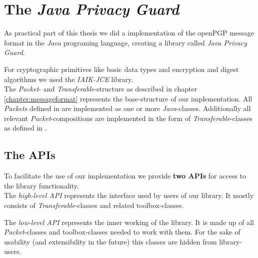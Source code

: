 \chapter{The \textit{Java Privacy Guard}} \label{chapter:jpg}


As practical part of this thesis we did a implementation of the openPGP message format \citep{RFC4880} in the \textit{Java} programing language, creating a library called \textit{Java Privacy Guard}.

For cryptographic primitives like basic data types and encryption and digest algorithms we used the \textit{IAIK-JCE} library. \\





The \textit{Packet}- and \textit{Transferable}-structure as described in chapter \ref{chapter:messageformat} represents the base-structure of our implementation. All \textit{Packets} defined in \citep[section 5]{RFC4880} are implemented as one or more \textit{Java}-classes. Additionally all relevant \textit{Packet}-compositions are implemented in the form of \textit{Transferable}-classes as defined in \citep[section 11]{RFC4880}.

\section{The APIs}


To facilitate the use of our implementation we provide \textbf{two APIs} for access to the library functionality. \\  

The \textit{high-level API} represents the interface used by users of our library. It mostly consists of \textit{Transferable}-classes and related toolbox-classes.

The \textit{low-level API} represents the inner working of the library. It is made up of all \textit{Packet}-classes and toolbox-classes needed to work with them. For the sake of usability (and extensibility in the future) this classes are hidden from library-users. \\

